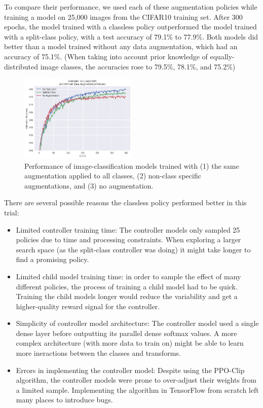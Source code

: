 \documentclass[10pt,twocolumn,letterpaper]{article}
\begin{document}
    To compare their performance, we used each of these augmentation policies while training a model on 25,000 images from the CIFAR10 training set. After 300 epochs, the model trained with a classless policy outperformed the model trained with a split-class policy, with a test accuracy of 79.1\% to 77.9\%. Both models did better than a model trained without any data augmentation, which had an accuracy of 75.1\%.  (When taking into account prior knowledge of equally-distributed image classes, the accuracies rose to 79.5\%, 78.1\%, and 75.2\%)
    
    \begin{figure}[h]
    	\begin{center}
    		\includegraphics[width=0.5\textwidth]{ValAccuracies.png}
    	\end{center}
    	\caption{Performance of image-classification models trained with (1) the same augmentation applied to all classes, (2) non-class specific augmentations, and (3) no augmentation.}
    	\label{fig:ValAccuracies}
    \end{figure}
    
    There are several possible reasons the classless policy performed better in this trial:
    
    \begin{itemize}
      \item 
        Limited controller training time: The controller models only sampled 25 policies due to time and processing constraints. When exploring a larger search space (as the split-class controller was doing) it might take longer to find a promising policy.
      \item 
        Limited child model training time: in order to sample the effect of many different policies, the process of training a child model had to be quick. Training the child models longer would reduce the variability and get a higher-quality reward signal for the controller.
      \item 
        Simplicity of controller model architecture: The controller model used a single dense layer before outputting its parallel dense softmax values. A more complex architecture (with more data to train on) might be able to learn more ineractions between the classes and transforms.
      \item 
        Errors in implementing the controller model: Despite using the PPO-Clip algorithm, the controller models were prone to over-adjust their weights from a limited sample. Implementing the algorithm in TensorFlow from scratch left many places to introduce bugs.
    \end{itemize}
\end{document}
